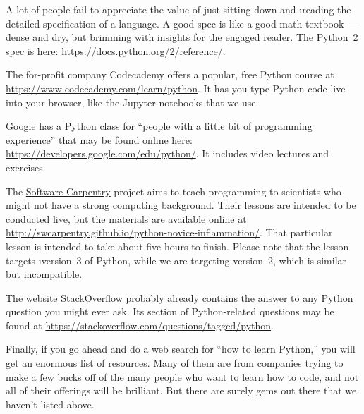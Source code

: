 \documentclass[letterpaper, 12pt, titlepage, twoside]{article}
\begin{document}
A lot of people fail to appreciate the value of just sitting down and
\i{reading the detailed specification} of a language. A good spec is like a
good math textbook --- dense and dry, but brimming with insights for the
engaged reader. The Python~2 spec is here:
\url{https://docs.python.org/2/reference/}.

The for-profit company Codecademy offers a popular, free Python course at
\url{https://www.codecademy.com/learn/python}. It has you type Python code
live into your browser, like the Jupyter notebooks that we use.

Google has a Python class for ``people with a little bit of programming
experience'' that may be found online here:
\url{https://developers.google.com/edu/python/}. It includes video lectures
and exercises.

The \href{https://software-carpentry.org/}{Software Carpentry} project aims to
teach programming to scientists who might not have a strong computing
background. Their lessons are intended to be conducted live, but the materials
are available online at
\url{http://swcarpentry.github.io/python-novice-inflammation/}. That
particular lesson is intended to take about five hours to finish. Please note
that the lesson targets \i{version~3} of Python, while we are targeting
version~2, which is similar but incompatible.

The website \href{https://stackoverflow.com/}{StackOverflow} probably already
contains the answer to any Python question you might ever ask. Its section of
Python-related questions may be found at
\url{https://stackoverflow.com/questions/tagged/python}.

Finally, if you go ahead and do a web search for ``how to learn Python,'' you
will get an enormous list of resources. Many of them are from companies trying
to make a few bucks off of the many people who want to learn how to code, and
not all of their offerings will be brilliant. But there are surely gems out
there that we haven't listed above.
\end{document}
